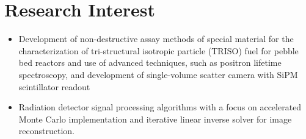 \documentclass[letterpaper,11pt]{article} %
\newcommand{\CVItem}[1]{
  \item\small{
    {#1 \vspace{-2pt}}
  }
}
\newcommand{\CVItemListStart}{\begin{itemize}}
\newcommand{\CVItemListEnd}{\end{itemize}\vspace{-5pt}}
\begin{document}
\begin{comment}
try to briefly explain what you did and why it is relevant to the position you
are seeking
\end{comment}
\begin{comment}
Ideally the title of the work should speak for what it is. However if you feel
like you should explain more about why the project is applicable to this job,
use item list as is shown in the work experience section.
\end{comment}
\section{Research Interest}
  \CVItemListStart
    \CVItem{{Development of non-destructive assay methods of special material for the characterization of tri-structural isotropic particle (TRISO) fuel for pebble bed reactors and use of advanced techniques, such as positron lifetime spectroscopy, and development of single-volume scatter camera with SiPM scintillator readout}}
    \CVItem{Radiation detector signal processing algorithms with a focus on accelerated Monte Carlo implementation and iterative linear inverse solver for image reconstruction.}
  \CVItemListEnd
\end{document}

